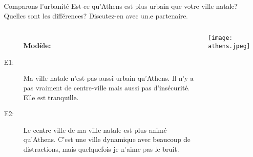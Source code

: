 \begin{frame}{Comparons l'urbanité}
  Est-ce qu'Athens est plus urbain que votre ville natale?
  Quelles sont les différences?
  Discutez-en avec un.e partenaire.
  \begin{columns}
      \small
      \begin{description}
        \item[] \textbf{Modèle:}
        \item[E1:] Ma ville natale n'est pas aussi urbain qu'Athens. Il n'y a pas vraiment de centre-ville mais aussi pas d'insécurité. Elle est tranquille.
        \item[E2:] Le centre-ville de ma ville natale est plus animé qu'Athens. C'est une ville dynamique avec beaucoup de distractions, mais quelquefois je n'aime pas le bruit.
      \end{description}
      \begin{center}
        \texttt{[image: athens.jpeg]}
      \end{center}
  \end{columns}
\end{frame}